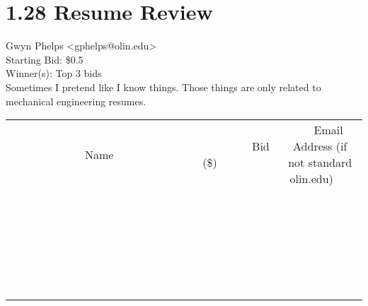 \documentclass[11pt]{article}
\begin{document}
					\section*{1.28 Resume Review}
					Gwyn Phelps <gphelps@olin.edu> \\
					Starting Bid: \$0.5 \\
					Winner(s): Top 3 bids \\
					Sometimes I pretend like I know things. Those things are only related to mechanical engineering resumes. \\
					[6ex]
					\begin{tabular}{c c c}
						~~~~~~~~~~~~~Name~~~~~~~~~~~~~ & ~~~~~~~~~Bid (\$)~~~~~~~~~ & ~~~Email Address (if not standard olin.edu)~~~ \\
				
 & & \\
\hline
 & & \\
\hline
 & & \\
\hline
 & & \\
\hline
 & & \\
\hline
 & & \\
\hline
 & & \\
\hline
 & & \\
\hline
 & & \\
\hline
 & & \\
\hline
 & & \\
\hline
 & & \\
\hline
 & & \\
\hline
 & & \\
\hline
 & & \\
\hline
 & & \\
\hline
 & & \\
\hline
 & & \\
\hline
 & & \\
\hline
 & & \\
\hline
 & & \\
\hline
 & & \\
\hline
 & & \\
\hline
 & & \\
\hline
 & & \\
\hline
 & & \\
\hline
					\end{tabular}
					\clearpage
				
\end{document}
